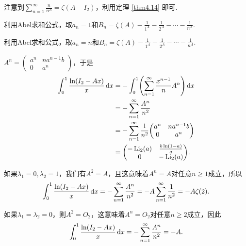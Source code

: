 \begin{solution}
  注意到$\sum_{n=1}^\infty\frac n{n^A}=\zeta(A-I_2)$，利用定理 \ref{thm4.14} 即可.
\end{solution}

\begin{solution}
  \begin{inparaenum}[(a)]
    \item 利用Abel求和公式，取$a_n=1$和$B_n=\zeta(A)-\frac1{1^A}-
        \frac1{2^A}-\cdots-\frac1{n^A}$.

    \item 利用Abel求和公式，取$a_n=n$和$B_n=\zeta(A)-\frac1{1^A}-
        \frac1{2^A}-\cdots-\frac1{n^A}$.
  \end{inparaenum}
\end{solution}

\begin{solution}
  $A^n=\begin{pmatrix}
    a^n & na^{n-1}b \\
    0 & a^n
  \end{pmatrix}$，于是
  \begin{align*}
    \int_0^1 \frac{\ln(I_2-Ax)}x \dif x & = - \int_0^1 \left( \sum_{n=1}^\infty \frac{x^{n-1}}n A^n \right) \dif x \\
    & = -\sum_{n=1}^\infty \frac{A^n}{n^2} \\
    & = - \sum_{n=1}^\infty \frac1{n^2} \begin{pmatrix}
      a^n & na^{n-1}b \\
      0 & a^n
    \end{pmatrix} \\
    & = \begin{pmatrix}
      -\Li_2(a) & \frac{b\ln(1-a)}a \\
      0 & - \Li_2(a)
    \end{pmatrix}.
  \end{align*}
\end{solution}

\begin{solution}
  如果$\lambda_1=0,\lambda_2=1$，我们有$A^2=A$，且这意味着$A^n=A$对任意$n\ge1$成立，所以
  \[
    \int_0^1\frac{\ln(I_2-Ax)}x \mathop{}\!\mathrm d x = - \sum_{n=1}^\infty \frac{A^n}{n^2} = -A\sum_{n=1}^\infty \frac1{n^2} = -A\zeta(2).
  \]

  如果$\lambda_1=\lambda_2=0$，则$A^2=O_2$，这意味着$A^n=O_2$对任意$n\ge2$成立，因此
  \[
    \int_0^1\frac{\ln(I_2-Ax)}x \mathop{}\!\mathrm d x = - \sum_{n=1}^\infty \frac{A^n}{n^2} = -A.
  \]
\end{solution}

